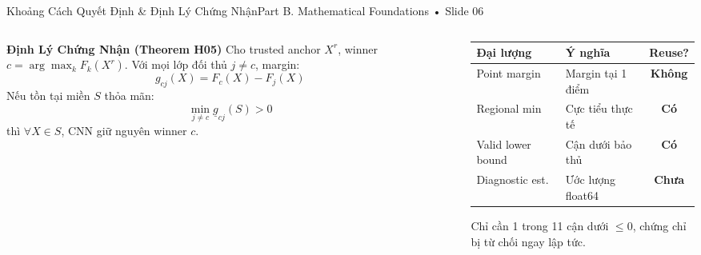 \documentclass[aspectratio=169, 10pt]{beamer}
\begin{document}
\begin{frame}{Khoảng Cách Quyết Định \& Định Lý Chứng Nhận}{Part B. Mathematical Foundations • Slide 06}
    \begin{columns}
        \begin{column}{0.52\textwidth}
            \begin{block}{\textbf{Định Lý Chứng Nhận (Theorem H05)}}
                Cho trusted anchor $X^r$, winner $c = \arg\max_k F_k(X^r)$.
                Với mọi lớp đối thủ $j \neq c$, margin:
                $$g_{cj}(X) = F_c(X) - F_j(X)$$
                Nếu tồn tại miền $S$ thỏa mãn:
                $$\boxed{\min_{j \neq c} \underline{g}_{cj}(S) > 0}$$
                thì $\forall X \in S$, CNN giữ nguyên winner $c$.
            \end{block}
        \end{column}
        \begin{column}{0.44\textwidth}
            \small
            \begin{tabular}{llc}
                \toprule
                \textbf{Đại lượng} & \textbf{Ý nghĩa} & \textbf{Reuse?} \\
                \midrule
                Point margin & Margin tại 1 điểm & \textcolor{AlertRed}{\textbf{Không}} \\
                Regional min & Cực tiểu thực tế & \textcolor{MintGreen}{\textbf{Có}} \\
                Valid lower bound & Cận dưới bảo thủ & \textcolor{MintGreen}{\textbf{Có}} \\
                Diagnostic est. & Ước lượng float64 & \textcolor{WarnAmber}{\textbf{Chưa}} \\
                \bottomrule
            \end{tabular}
            \vspace{0.2cm}
            \footnotesize
            Chỉ cần 1 trong 11 cận dưới $\le 0$, chứng chỉ bị từ chối ngay lập tức.
        \end{column}
    \end{columns}
\end{frame}
\end{document}
